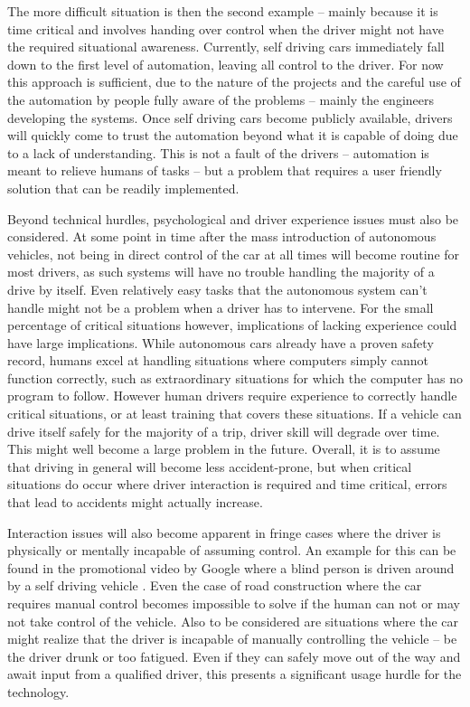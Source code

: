 \documentclass{acm_proc_article-sp}
\begin{document}
The more difficult situation is then the second example – mainly because it is time critical and involves handing over control when the driver might not have the required situational awareness.
Currently, self driving cars immediately fall down to the first level of automation, leaving all control to the driver.
For now this approach is sufficient, due to the nature of the projects and the careful use of the automation by people fully aware of the problems – mainly the engineers developing the systems.
Once self driving cars become publicly available, drivers will quickly come to trust the automation beyond what it is capable of doing due to a lack of understanding.
This is not a fault of the drivers – automation is meant to relieve humans of tasks – but a problem that requires a user friendly solution that can be readily implemented.

Beyond technical hurdles, psychological and driver experience issues must also be considered.
At some point in time after the mass introduction of autonomous vehicles, not being in direct control of the car at all times will become routine for most drivers, as such systems will have no trouble handling the majority of a drive by itself.
Even relatively easy tasks that the autonomous system can't handle might not be a problem when a driver has to intervene.
For the small percentage of critical situations however, implications of lacking experience could have large implications.
While autonomous cars already have a proven safety record, humans excel at handling situations where computers simply cannot function correctly, such as extraordinary situations for which the computer has no program to follow.
However human drivers require experience to correctly handle critical situations, or at least training that covers these situations.
If a vehicle can drive itself safely for the majority of a trip, driver skill will degrade over time.
This might well become a large problem in the future.
Overall, it is to assume that driving in general will become less accident-prone, but when critical situations do occur where driver interaction is required and time critical, errors that lead to accidents might actually increase.

Interaction issues will also become apparent in fringe cases where the driver is physically or mentally incapable of assuming control.
An example for this can be found in the promotional video by Google where a blind person is driven around by a self driving vehicle \cite{www:google_blind}.
Even the case of road construction where the car requires manual control becomes impossible to solve if the human can not or may not take control of the vehicle.
Also to be considered are situations where the car might realize that the driver is incapable of manually controlling the vehicle – be the driver drunk or too fatigued.
Even if they can safely move out of the way and await input from a qualified driver, this presents a significant usage hurdle for the technology.
\end{document}

